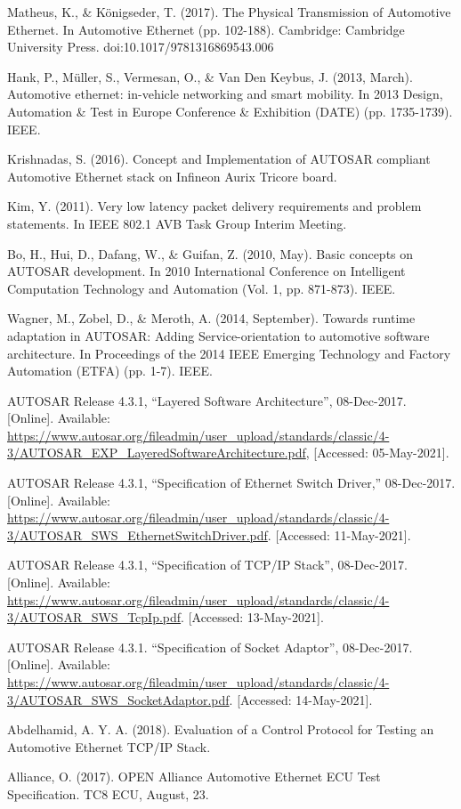 \documentclass[a4paper, 12pt, oneside, BCOR1cm,toc=chapterentrywithdots]{scrbook}
\begin{document}
\begin{thebibliography}{00}
Matheus, K., \& Königseder, T. (2017). The Physical Transmission of Automotive Ethernet. In Automotive Ethernet (pp. 102-188). Cambridge: Cambridge University Press. doi:10.1017/9781316869543.006

 Hank, P., Müller, S., Vermesan, O., \& Van Den Keybus, J. (2013, March). Automotive ethernet: in-vehicle networking and smart mobility. In 2013 Design, Automation \& Test in Europe Conference \& Exhibition (DATE) (pp. 1735-1739). IEEE.

 Krishnadas, S. (2016). Concept and Implementation of AUTOSAR compliant Automotive Ethernet stack on Infineon Aurix Tricore board.

Kim, Y. (2011). Very low latency packet delivery requirements and problem statements. In IEEE 802.1 AVB Task Group Interim Meeting.

Bo, H., Hui, D., Dafang, W., \& Guifan, Z. (2010, May). Basic concepts on AUTOSAR development. In 2010 International Conference on Intelligent Computation Technology and Automation (Vol. 1, pp. 871-873). IEEE.

Wagner, M., Zobel, D., \& Meroth, A. (2014, September). Towards runtime adaptation in AUTOSAR: Adding Service-orientation to automotive software architecture. In Proceedings of the 2014 IEEE Emerging Technology and Factory Automation (ETFA) (pp. 1-7). IEEE.

 AUTOSAR Release 4.3.1, “Layered Software Architecture”, 08-Dec-2017. [Online]. Available: \url{https://www.autosar.org/fileadmin/user\_upload/standards/classic/4-3/AUTOSAR_EXP_LayeredSoftwareArchitecture.pdf}, [Accessed: 05-May-2021]. 

 AUTOSAR Release 4.3.1, “Specification of Ethernet Switch Driver,” 08-Dec-2017. [Online]. Available: \url{https://www.autosar.org/fileadmin/user_upload/standards/classic/4-3/AUTOSAR_SWS_EthernetSwitchDriver.pdf}. [Accessed: 11-May-2021].  

AUTOSAR Release 4.3.1, “Specification of TCP/IP Stack”, 08-Dec-2017. [Online]. Available: \url{https://www.autosar.org/fileadmin/user_upload/standards/classic/4-3/AUTOSAR_SWS_TcpIp.pdf}. [Accessed: 13-May-2021].

 AUTOSAR Release 4.3.1. “Specification of Socket Adaptor”, 08-Dec-2017. [Online]. Available: \url{https://www.autosar.org/fileadmin/user_upload/standards/classic/4-3/AUTOSAR_SWS_SocketAdaptor.pdf}. [Accessed: 14-May-2021].

Abdelhamid, A. Y. A. (2018). Evaluation of a Control Protocol for Testing an Automotive Ethernet TCP/IP Stack.

Alliance, O. (2017). OPEN Alliance Automotive Ethernet ECU Test Specification. TC8 ECU, August, 23.

\end{thebibliography}
\end{document}
